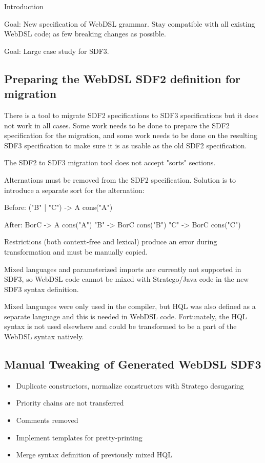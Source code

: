     Introduction

    Goal: New specification of WebDSL grammar. Stay compatible with all existing WebDSL code; as few breaking changes as possible.

    Goal: Large case study for SDF3.

    \subsection{Preparing the WebDSL SDF2 definition for migration}

      There is a tool to migrate SDF2 specifications to SDF3 specifications but it does not work in all cases. Some work needs to be done to prepare the SDF2 specification for the migration, and some work needs to be done on the resulting SDF3 specification to make sure it is as usable as the old SDF2 specification.

      The SDF2 to SDF3 migration tool does not accept "sorts" sections.

      Alternations must be removed from the SDF2 specification. Solution is to introduce a separate sort for the alternation:

      Before:
      ("B" | "C") -> A {cons("A")}

      After:
      BorC -> A    {cons("A")}
      "B"  -> BorC {cons("B")}
      "C"  -> BorC {cons("C")}

      Restrictions (both context-free and lexical) produce an error during transformation and must be manually copied.

      Mixed languages and parameterized imports are currently not supported in SDF3, so WebDSL code cannot be mixed with Stratego/Java code in the new SDF3 syntax definition.

      Mixed languages were only used in the compiler, but HQL was also defined as a separate language and this is needed in WebDSL code. Fortunately, the HQL syntax is not used elsewhere and could be transformed to be a part of the WebDSL syntax natively.

    \subsection{Manual Tweaking of Generated WebDSL SDF3}

      \begin{itemize}
        \item Duplicate constructors, normalize constructors with Stratego desugaring
        \item Priority chains are not transferred
        \item Comments removed
        \item Implement templates for pretty-printing
        \item Merge syntax definition of previously mixed HQL
      \end{itemize}

